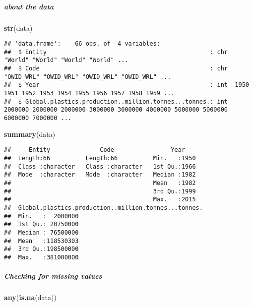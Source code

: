 \documentclass[
]{article}
\newenvironment{Shaded}{\begin{snugshade}}{\end{snugshade}}
\newcommand{\KeywordTok}[1]{\textcolor[rgb]{0.13,0.29,0.53}{\textbf{#1}}}
\newcommand{\NormalTok}[1]{#1}
\begin{document}
\hypertarget{about-the-data}{%
\subparagraph{about the data}\label{about-the-data}}

\begin{Shaded}
\begin{Highlighting}[]
\KeywordTok{str}\NormalTok{(data)}
\end{Highlighting}
\end{Shaded}

\begin{verbatim}
## 'data.frame':    66 obs. of  4 variables:
##  $ Entity                                              : chr  "World" "World" "World" "World" ...
##  $ Code                                                : chr  "OWID_WRL" "OWID_WRL" "OWID_WRL" "OWID_WRL" ...
##  $ Year                                                : int  1950 1951 1952 1953 1954 1955 1956 1957 1958 1959 ...
##  $ Global.plastics.production..million.tonnes...tonnes.: int  2000000 2000000 2000000 3000000 3000000 4000000 5000000 5000000 6000000 7000000 ...
\end{verbatim}

\begin{Shaded}
\begin{Highlighting}[]
\KeywordTok{summary}\NormalTok{(data)}
\end{Highlighting}
\end{Shaded}

\begin{verbatim}
##     Entity              Code                Year     
##  Length:66          Length:66          Min.   :1950  
##  Class :character   Class :character   1st Qu.:1966  
##  Mode  :character   Mode  :character   Median :1982  
##                                        Mean   :1982  
##                                        3rd Qu.:1999  
##                                        Max.   :2015  
##  Global.plastics.production..million.tonnes...tonnes.
##  Min.   :  2000000                                   
##  1st Qu.: 20750000                                   
##  Median : 76500000                                   
##  Mean   :118530303                                   
##  3rd Qu.:198500000                                   
##  Max.   :381000000
\end{verbatim}

\hypertarget{checking-for-missing-values}{%
\subparagraph{Checking for missing
values}\label{checking-for-missing-values}}

\begin{Shaded}
\begin{Highlighting}[]
\KeywordTok{any}\NormalTok{(}\KeywordTok{is.na}\NormalTok{(data))}
\end{Highlighting}
\end{Shaded}
\end{document}
